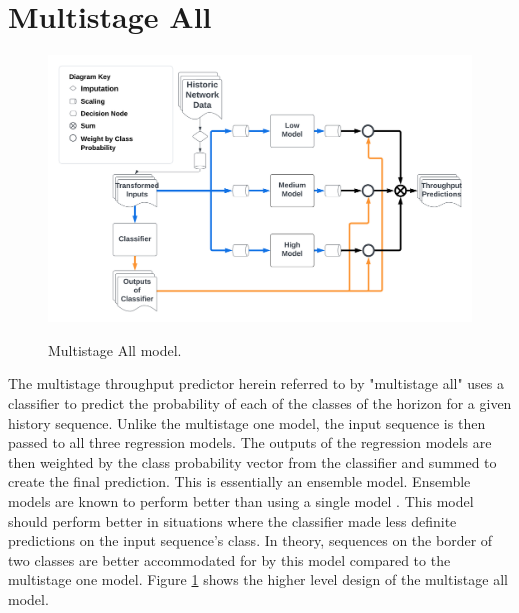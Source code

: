 \section{Multistage All}
\begin{figure}[h]
\centering
\includegraphics[scale=0.17]{Multistage All.png}
\label{fig:multistage_all}
\caption{Multistage All model.}
\end{figure}

The multistage throughput predictor herein referred to by "multistage all" uses a classifier to predict the probability of each of the classes of the horizon for a given history sequence. Unlike the multistage one model, the input sequence is then passed to all three regression models. The outputs of the regression models are then weighted by the class probability vector from the classifier and summed to create the final prediction. This is essentially an ensemble model. Ensemble models are known to perform better than using a single model \cite{https://doi.org/10.1002/widm.1249}. This model should perform better in situations where the classifier made less definite predictions on the input sequence's class. In theory, sequences on the border of two classes are better accommodated for by this model compared to the multistage one model. Figure \ref{fig:multistage_all} shows the higher level design of the multistage all model.